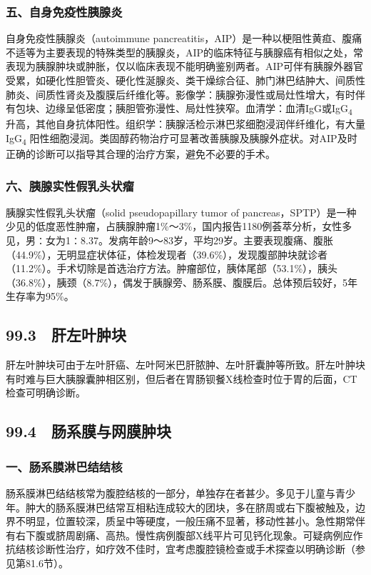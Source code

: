 \subsubsection{五、自身免疫性胰腺炎}

自身免疫性胰腺炎（autoimmune
pancreatitis，AIP）是一种以梗阻性黄疸、腹痛不适等为主要表现的特殊类型的胰腺炎，AIP的临床特征与胰腺癌有相似之处，常表现为胰腺肿块或肿胀，仅以临床表现不能明确鉴别两者。AIP可伴有胰腺外器官受累，如硬化性胆管炎、硬化性涎腺炎、类干燥综合征、肺门淋巴结肿大、间质性肺炎、间质性肾炎及腹膜后纤维化等。影像学：胰腺弥漫性或局灶性增大，有时伴有包块、边缘呈低密度；胰胆管弥漫性、局灶性狭窄。血清学：血清IgG或IgG\textsubscript{4}
升高，其他自身抗体阳性。组织学：胰腺活检示淋巴浆细胞浸润伴纤维化，有大量IgG\textsubscript{4}
阳性细胞浸润。类固醇药物治疗可显著改善胰腺及胰腺外症状。对AIP及时正确的诊断可以指导其合理的治疗方案，避免不必要的手术。

\subsubsection{六、胰腺实性假乳头状瘤}

胰腺实性假乳头状瘤（solid pseudopapillary tumor of
pancreas，SPTP）是一种少见的低度恶性肿瘤，占胰腺肿瘤1\%～3\%，国内报告1180例荟萃分析，女性多见，男∶女为1∶8.37。发病年龄9～83岁，平均29岁。主要表现腹痛、腹胀（44.9\%），无明显症状体征，体检发现者（39.6\%），发现腹部肿块就诊者（11.2\%）。手术切除是首选治疗方法。肿瘤部位，胰体尾部（53.1\%），胰头（36.8\%），胰颈（8.7\%），偶发于胰腺旁、肠系膜、腹膜后。总体预后较好，5年生存率为95\%。

\subsection{99.3　肝左叶肿块}

肝左叶肿块可由于左叶肝癌、左叶阿米巴肝脓肿、左叶肝囊肿等所致。肝左叶肿块有时难与巨大胰腺囊肿相区别，但后者在胃肠钡餐X线检查时位于胃的后面，CT检查可明确诊断。

\subsection{99.4　肠系膜与网膜肿块}

\subsubsection{一、肠系膜淋巴结结核}

肠系膜淋巴结结核常为腹腔结核的一部分，单独存在者甚少。多见于儿童与青少年。肿大的肠系膜淋巴结常互相粘连成较大的团块，多在脐周或右下腹被触及，边界不明显，位置较深，质呈中等硬度，一般压痛不显著，移动性甚小。急性期常伴有右下腹或脐周剧痛、高热。慢性病例腹部X线平片可见钙化现象。可疑病例应作抗结核诊断性治疗，如疗效不佳时，宜考虑腹腔镜检查或手术探查以明确诊断（参见第81.6节）。

